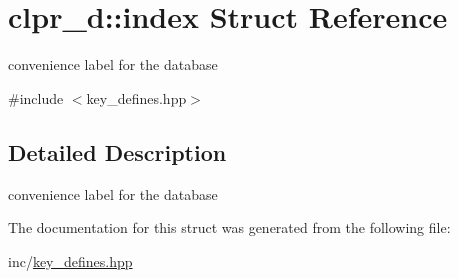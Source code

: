 \hypertarget{structclpr__d_1_1index}{\section{clpr\-\_\-d\-:\-:index \-Struct \-Reference}
\label{structclpr__d_1_1index}
}


convenience label for the database  




{\ttfamily \#include $<$key\-\_\-defines.\-hpp$>$}



\subsection{\-Detailed \-Description}
convenience label for the database 

\-The documentation for this struct was generated from the following file\-:\begin{DoxyCompactItemize}
\item 
inc/\hyperlink{key__defines_8hpp}{key\-\_\-defines.\-hpp}\end{DoxyCompactItemize}

